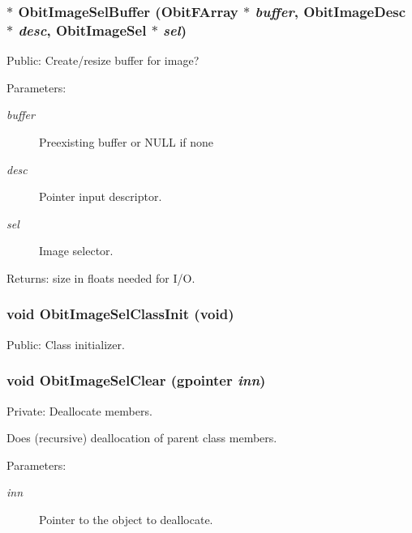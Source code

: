 \subsubsection{$\ast$ Obit\-Image\-Sel\-Buffer ({\bf Obit\-FArray} $\ast$ {\em buffer}, {\bf Obit\-Image\-Desc} $\ast$ {\em desc}, {\bf Obit\-Image\-Sel} $\ast$ {\em sel})}\label{ObitImageSel_8c_a9}


Public: Create/resize buffer for image? 

\begin{Desc}
\item[Parameters:]
\begin{description}
\item[{\em buffer}]Preexisting buffer or NULL if none \item[{\em desc}]Pointer input descriptor. \item[{\em sel}]Image selector. \end{description}
\end{Desc}
\begin{Desc}
\item[Returns:]size in floats needed for I/O. \end{Desc}
\subsubsection{\setlength{\rightskip}{0pt plus 5cm}void Obit\-Image\-Sel\-Class\-Init (void)}\label{ObitImageSel_8c_a13}


Public: Class initializer. 

\subsubsection{\setlength{\rightskip}{0pt plus 5cm}void Obit\-Image\-Sel\-Clear (gpointer {\em inn})}\label{ObitImageSel_8c_a4}


Private: Deallocate members. 

Does (recursive) deallocation of parent class members. \begin{Desc}
\item[Parameters:]
\begin{description}
\item[{\em inn}]Pointer to the object to deallocate. \end{description}
\end{Desc}
